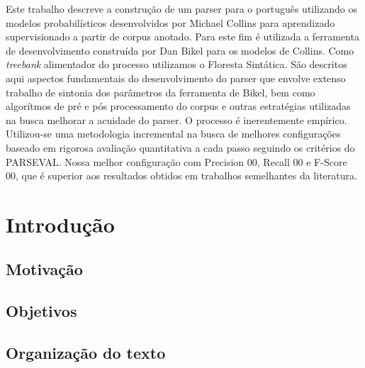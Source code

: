 \documentclass[a4paper]{abnt}
\begin{document}


\pagestyle{plain}


\begin{resumo}

Este trabalho descreve a construção de um parser para o português utilizando os modelos probabilísticos desenvolvidos por Michael Collins para aprendizado supervisionado a partir de corpus anotado. 
Para este fim é utilizada a ferramenta de desenvolvimento construída por Dan Bikel para os modelos de Collins. 
Como \emph{treebank} alimentador do processo utilizamos o Floresta Sintática.
São descritos aqui aspectos fundamentais do desenvolvimento do parser que envolve extenso trabalho de sintonia dos parâmetros da ferramenta de Bikel, bem como algorítmos de pré e pós processamento do corpus e outras estratégias utilizadas na busca melhorar a acuidade do parser. 
O processo é inerentemente empírico. Utilizou-se uma metodologia incremental na busca de melhores configurações baseado em rigorosa avaliação quantitativa a cada passo seguindo os critérios do PARSEVAL. 
Nossa melhor configuração com Precision 00, Recall 00 e F-Score 00, que é superior aos resultados obtidos em trabalhos semelhantes da literatura.

\end{resumo}


\tableofcontents
\listoffigures
\listoftables

%


\setcounter{page}{1}


\chapter{Introdução}
\label{cha:introducao}
    

\section{Motivação}
\label{sec:motivacao}
	

\section{Objetivos}
\label{sec:objetivos}
	

\newpage

\section{Organização do texto}
\label{sec:organizacao}
	
\end{document}
